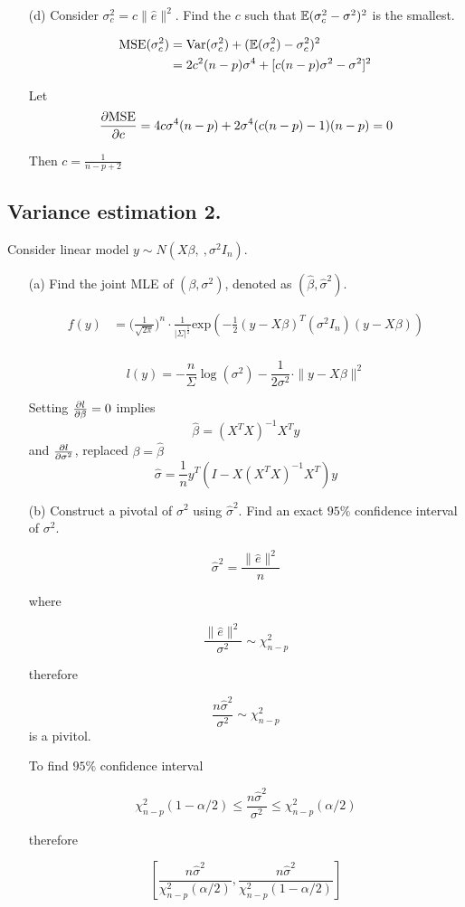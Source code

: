 \documentclass{tufte-book}
\begin{document}
\begin{enumerate}
\item[(d)] Consider $\sigma_c^2 = c\|\hat{e}\|^2$.  Find the $c$ such that $\operatorname{\mathbb{E}}(\sigma_c^2-\sigma^2)^2$ is the smallest.

\begin{align*}
\text{MSE}(\sigma_c^2) &= \operatorname{Var}(\sigma_c^2) + (\operatorname{\mathbb{E}}(\sigma_c^2) - \sigma_c^2)^2\\
&= 2c^2(n-p)\sigma^4 + [c(n-p)\sigma^2 - \sigma^2]^2
\end{align*}

Let
\[ \frac{\partial \text{MSE}}{\partial c} = 4c\sigma^4(n-p) + 2\sigma^4(c(n-p)-1)(n-p) = 0 \]

Then $c=\frac{1}{n-p+2}$
\end{enumerate}

\subsection{Variance estimation 2.} Consider linear model $y \sim N(X\beta,\ , \sigma^2I_n)$.

\begin{enumerate}
\item[(a)] Find the joint MLE of $(\beta, \sigma^2)$, denoted as $(\hat{\beta},\hat{\sigma}^2)$.

\begin{align*}
f(y) &= \Big(\frac{1}{\sqrt{2\pi}}\Big)^n \cdot \frac{1}{|\Sigma|^\frac{1}{2}} \text{exp}(-\frac{1}{2}(y-X\beta)^T(\sigma^2I_n)(y-X\beta))\\
\end{align*}

\[ l(y) = -\frac{n}{\Sigma}\log(\sigma^2) - \frac{1}{2\sigma^2} \cdot \|y-X\beta\|^2 \]

Setting $\frac{\partial l}{\partial \beta}=0$ implies
\[ \hat{\beta} = (X^TX)^{-1}X^Ty \]
and $\frac{\partial l}{\partial \sigma^2}$, replaced $\beta=\hat{\beta}$
\[ \hat{\sigma}=\frac{1}{n}y^T(I-X(X^TX)^{-1}X^T)y \]

\item[(b)] Construct a pivotal of $\sigma^2$ using $\hat{\sigma}^2$.  Find an exact $95\%$ confidence interval of $\sigma^2$.

\[ \hat{\sigma}^2 = \frac{\|\hat{e}\|^2}{n} \]

where

\[ \frac{\|\hat{e}\|^2}{\sigma^2} \sim \chi_{n-p}^2 \]

therefore

\[ \frac{n\hat{\sigma}^2}{\sigma^2} \sim \chi_{n-p}^2 \]
is a pivitol.

To find $95\%$ confidence interval

\[ \chi_{n-p}^2(1-\alpha/2) \leq \frac{n\hat{\sigma}^2}{\sigma^2} \leq \chi_{n-p}^2(\alpha/2) \]

therefore

\[ [\frac{n\hat{\sigma}^2}{\chi_{n-p}^2(\alpha/2)},\frac{n\hat{\sigma}^2}{\chi_{n-p}^2(1-\alpha/2)}]
\]
\end{enumerate}
\end{document}
